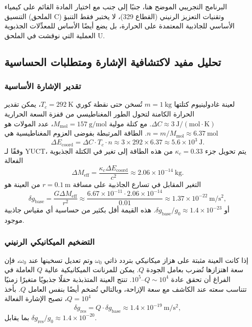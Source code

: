 \documentclass[11pt,a4paper]{article}
\begin{document}
	البرنامج التجريبي الموضح هنا، جنبًا إلى جنب مع اختيار المادة القائم على كيمياء التنسيق (الملحق C) وتقنيات التعزيز الرنيني (القطاع 329)، لا يختبر فقط التنبؤ الأساسي للجاذبية المعتمدة على الحرارة، بل يضع أيضًا الأساس للمعدِّلات الجذبوية العملية التي نوقشت في الملحق U.
	
	\subsection{تحليل مفيد لاكتشافية الإشارة ومتطلبات الحساسية}
	\label{subsec:signal-detectability}
	
	\subsubsection{تقدير الإشارة الأساسية}
	لعينة غادولينيوم كتلتها $m = 1\ \mathrm{kg}$ تُسخن حتى نقطة كوري $T_c = 292\ \mathrm{K}$، يمكن تقدير الحرارة الكامنة لتحول الطور المغناطيسي من قفزة السعة الحرارية $\Delta C \approx 3\ \mathrm{J/(mol\cdot K)}$. مع كتلة مولية $M_{\mathrm{mol}} = 157\ \mathrm{g/mol}$، عدد المولات هو $n = m / M_{\mathrm{mol}} \approx 6.37\ \mathrm{mol}$. الطاقة المرتبطة بفوضى العزوم المغناطيسية هي
	\[
	\Delta E_{\mathrm{coord}} = \Delta C \cdot T_c \cdot n \approx 3 \times 292 \times 6.37 \approx 5.6\times10^{3}\ \mathrm{J}.
	\]
	وفقًا لـ YUCT، يتم تحويل جزء $\kappa_c = 0.33$ من هذه الطاقة إلى تغير في الكتلة الجذبوية الفعالة
	\[
	\Delta M_{\mathrm{eff}} = \frac{\kappa_c \Delta E_{\mathrm{coord}}}{c^2} \approx 2.06\times10^{-14}\ \mathrm{kg}.
	\]
	التغير المقابل في تسارع الجاذبية على مسافة $r = 0.1\ \mathrm{m}$ من العينة هو
	\[
	\delta g_{\mathrm{base}} = \frac{G \Delta M_{\mathrm{eff}}}{r^2} \approx \frac{6.67\times10^{-11} \cdot 2.06\times10^{-14}}{0.01} \approx 1.37\times10^{-22}\ \mathrm{m/s^2},
	\]
	أو $\delta g_{\mathrm{base}}/g_0 \approx 1.4\times10^{-23}$. هذه القيمة أقل بكثير من حساسية أي مقياس جاذبية موجود.
	
	\subsubsection{التضخيم الميكانيكي الرنيني}
	إذا كانت العينة مثبتة على هزاز ميكانيكي بتردد ذاتي $\omega_0$ وتم تعديل تسخينها عند $\omega_0$، فإن سعة اهتزازها تُضرب بعامل الجودة $Q$. يمكن للمرنانت الميكانيكية عالية $Q$ العاملة في الفراغ أن تحقق عادة $Q \sim 10^4$–$10^5$. تنتج العينة المتذبذبة حقلًا جذبويًا متغيرًا زمنيًا تتناسب سعته عند الكاشف مع سعة الإزاحة، وبالتالي تُضخم أيضًا بنفس العامل $Q$. بأخذ $Q = 10^4$، تصبح الإشارة الفعالة
	\[
	\delta g_{\mathrm{res}} = Q \cdot \delta g_{\mathrm{base}} \approx 1.4\times10^{-19}\ \mathrm{m/s^2},
	\]
	بما يقابل $\delta g_{\mathrm{res}}/g_0 \approx 1.4\times10^{-20}$.
	
\end{document}
